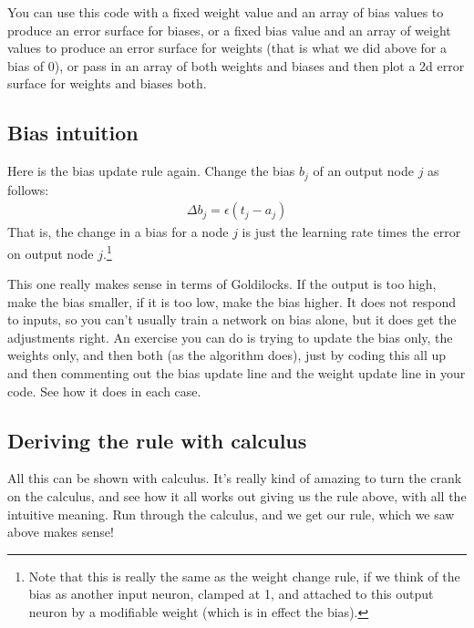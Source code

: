 You can use this code with a fixed weight value and an array of bias values to produce an error surface for biases, or a fixed bias value and an array of weight values to produce an error surface for weights (that is what we did above for a bias of 0), or pass in an array of both weights and biases and then plot a 2d error surface for weights and biases both.


\subsection{Bias intuition}

Here is the bias update rule again. Change the bias $b_j$ of an output node $j$ as follows: 
\begin{eqnarray*}
\Delta b_j  =  \epsilon (t_j - a_j)
\end{eqnarray*}
That is, the change in a bias for a node $j$ is just the learning rate times the error on output node $j$.\footnote{Note that this is really the same as the weight change rule, if we think of the bias as another input neuron, clamped at 1, and attached to this output neuron by a modifiable weight (which is in effect the bias).}

This one really makes sense in terms of Goldilocks. If the output is too high, make the bias smaller, if it is too low, make the bias higher. It does not respond to inputs, so you can't usually train a network on bias alone, but it does get the adjustments right. An exercise you can do is trying to update the bias only, the weights only, and then both (as the algorithm does), just by coding this all up and then commenting out the bias update line and the weight update line in your code. See how it does in each case.

\subsection{Deriving the rule with calculus}

All this can be shown with calculus. It's really kind of amazing to turn the crank on the calculus, and see how it all works out giving us the rule above,  with all the intuitive meaning. Run through the calculus, and we get our rule, which we saw above makes sense!


